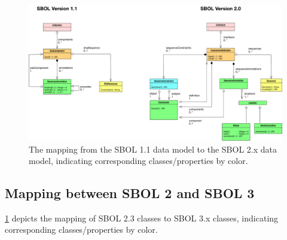 \begin{figure}[h]
\begin{center}
  \includegraphics[width=\textwidth]{images/sbol_v1_to_v2}
\end{center}
\caption{\label{SBOL1TO2}The mapping from the SBOL 1.1 data model to the SBOL 2.x  data model, indicating corresponding classes/properties by color.}
\end{figure}

\subsection{Mapping between SBOL 2 and SBOL 3}

\ref{SBOL1TO2} depicts the mapping of SBOL 2.3 classes to SBOL 3.x classes, indicating corresponding classes/properties by color.

